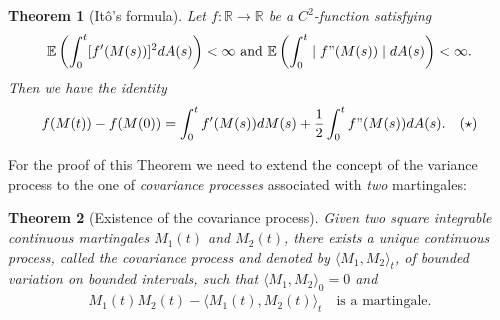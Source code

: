 \documentclass[11pt,a4paper, final]{article}
\newtheorem{thm}{Theorem}[section]
\begin{document}
\begin{thm}[Itô's formula] \label{itosformula}
Let $f: \mathbb{R} \to \mathbb{R}$ be a $C^2$-function satisfying
\begin{align*}
\mathbb{E}\left( \int_0^t [f'(M(s))]^2 dA(s) \right) < \infty \text{ and } 
\mathbb{E}\left( \int_0^t \mid f"(M(s))\mid dA(s) \right) < \infty.
\end{align*}
Then we have the identity
\begin{align*}
f(M(t))-f(M(0))= \int_0^t f'(M(s)) dM(s) + \frac{1}{2} \int_0^t f"(M(s)) dA(s). \quad (\star)
\end{align*}
\end{thm}
\noindent For the proof of this Theorem we need to extend the concept of the variance process to the one of \textit{covariance processes} associated with \textit{two} martingales:
\begin{thm}[Existence of the covariance process]
Given two square integrable continuous martingales $M_1(t)$ and $M_2(t)$, there exists a unique continuous process, called the covariance process and denoted by
$\langle M_1,M_2\rangle_t$, of bounded variation on bounded intervals, such that $\langle M_1,M_2\rangle_0=0$ and 
\begin{align*}M_1(t) M_2(t)-\langle M_1(t),M_2(t) \rangle_t \quad \text{is a martingale.}
\end{align*}
\end{thm}
\end{document}
